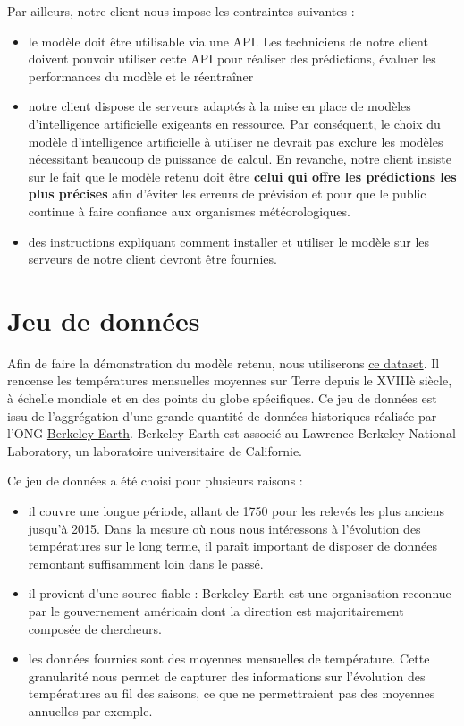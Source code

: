 \documentclass[french]{article}
\begin{document}
    Par ailleurs, notre client nous impose les contraintes suivantes :
    \begin{itemize}
        \item le modèle doit être utilisable via une API. Les techniciens de notre client doivent pouvoir utiliser cette API pour réaliser des prédictions, évaluer les performances du modèle et le réentraîner
        \item notre client dispose de serveurs adaptés à la mise en place de modèles d'intelligence artificielle exigeants en ressource. Par conséquent, le choix du modèle d'intelligence artificielle à utiliser ne devrait pas exclure les modèles nécessitant beaucoup de puissance de calcul. En revanche, notre client insiste sur le fait que le modèle retenu doit être \textbf{celui qui offre les prédictions les plus précises} afin d'éviter les erreurs de prévision et pour que le public continue à faire confiance aux organismes météorologiques.
        \item des instructions expliquant comment installer et utiliser le modèle sur les serveurs de notre client devront être fournies.
    \end{itemize}

    \section{Jeu de données}
    
    Afin de faire la démonstration du modèle retenu, nous utiliserons \href{https://www.kaggle.com/datasets/berkeleyearth/climate-change-earth-surface-temperature-data}{ce dataset}. Il rencense les températures mensuelles moyennes sur Terre depuis le XVIIIè siècle, à échelle mondiale et en des points du globe spécifiques. Ce jeu de données est issu de l'aggrégation d'une grande quantité de données historiques réalisée par l'ONG \href{http://berkeleyearth.org/about/}{Berkeley Earth}. Berkeley Earth est associé au Lawrence Berkeley National Laboratory, un laboratoire universitaire de Californie.

    Ce jeu de données a été choisi pour plusieurs raisons :
    \begin{itemize}
        \item il couvre une longue période, allant de 1750 pour les relevés les plus anciens jusqu'à 2015. Dans la mesure où nous nous intéressons à l'évolution des températures sur le long terme, il paraît important de disposer de données remontant suffisamment loin dans le passé.
        \item il provient d'une source fiable : Berkeley Earth est une organisation reconnue par le gouvernement américain dont la direction est majoritairement composée de chercheurs.
        \item les données fournies sont des moyennes mensuelles de température. Cette granularité nous permet de capturer des informations sur l'évolution des températures au fil des saisons, ce que ne permettraient pas des moyennes annuelles par exemple.
    \end{itemize}
    
\end{document}
